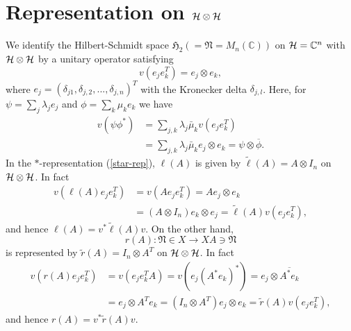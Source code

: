 \section{Representation on $\cal{H}\otimes\cal{H}$}

 We identify the Hilbert-Schmidt space $\mathfrak{H}_2(=\mathfrak{N}=M_n(\mathbb{C}))$ on ${\cal H}=\mathbb{C}^n$ with $\cal{H}\otimes\cal{H}$
by a unitary operator satisfying 
$$
v(e_je_k^T)=e_j\otimes e_k,
$$
where $e_j=(\delta_{j1},\delta_{j,2},...,\delta_{j,n})^T$ with the Kronecker delta $\delta_{j,l}$. 
Here, for $\psi=\sum_j \lambda_j e_j$ and $\phi=\sum_k \mu_k e_k$
we have
\begin{equation}
\begin{split}
v(\psi\phi^\ast)&=\sum_{j,k}\lambda_j\bar{\mu}_k v(e_je_k^T)\\
&=\sum_{j,k}\lambda_j\bar{\mu}_k e_j\otimes e_k={\psi}\otimes \overline{\phi}.
\end{split}
\end{equation}
In the $\ast$-representation (\ref{star-rep}), $\ell(A)$ is given by $\tilde{\ell}(A)=A\otimes I_n$ on $\cal{H}\otimes\cal{H}$.
In fact
 \begin{equation}
 \begin{split}
 v(\ell(A)e_je_k^T)&=v(Ae_je_k^T)=Ae_j\otimes e_k\\
 &= (A\otimes I_n)e_k\otimes  e_j=\tilde{\ell}(A)v(e_je_k^T),
 \end{split} 
 \end{equation}
 and hence $\ell(A)=v^{\ast}\tilde{\ell}(A)v$. 
On the other hand, 
$$
r(A):\mathfrak{N}\in X \to XA\ni\mathfrak{N}
$$ 
is represented by $\tilde{r}(A)=I_n\otimes A^T$ on $\cal{H}\otimes\cal{H}$.
In fact
 \begin{equation}
 \begin{split}
 v(r(A)e_je_k^T)&=v(e_je_k^TA)=v(e_j(A^\ast e_k)^\ast)=e_j\otimes \overline{A^\ast e_k}\\
 &= e_j \otimes A^T e_k= (I_n\otimes A^T)e_j\otimes  e_k=\tilde{r}(A)v(e_je_k^T),
 \end{split} 
 \end{equation}
 and hence $r(A)=v^{\ast}\tilde{r}(A) v$. 
